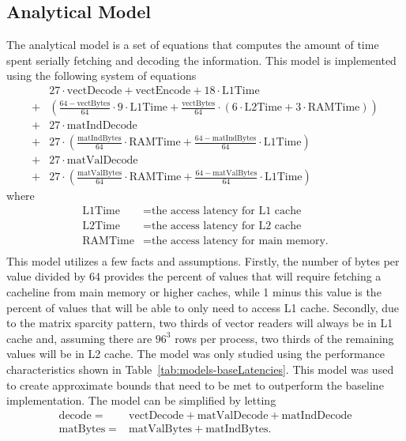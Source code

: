 \subsection{Analytical Model}

The analytical model is a set of equations that computes the amount of time spent serially fetching and decoding the information.
This model is implemented using the following system of equations
\begin{align*}
	& 27\cdot \mathrm{vectDecode}+\mathrm{vectEncode} + 18\cdot \mathrm{L1Time} \\
	+ & \left(\frac{64-\mathrm{vectBytes}}{64}\cdot 9\cdot \mathrm{L1Time}+\frac{\mathrm{vectBytes}}{64}\cdot \left(6\cdot \mathrm{L2Time}+3\cdot \mathrm{RAMTime}\right)\right) \\
	+ & 27\cdot\mathrm{matIndDecode} \\
	+ & 27\cdot\left(\frac{\mathrm{matIndBytes}}{64}\cdot\mathrm{RAMTime} + \frac{64-\mathrm{matIndBytes}}{64}\cdot\mathrm{L1Time}\right) \\
	+ & 27\cdot\mathrm{matValDecode} \\
	+ & 27\cdot\left(\frac{\mathrm{matValBytes}}{64}\cdot\mathrm{RAMTime}+\frac{64-\mathrm{matValBytes}}{64}\cdot\mathrm{L1Time}\right)
\end{align*}
where
\begin{align*}
	\mathrm{L1Time} &= \text{the access latency for L1 cache} \\
	\mathrm{L2Time} &= \text{the access latency for L2 cache} \\
	\mathrm{RAMTime} &= \text{the access latency for main memory.} \\
\end{align*}
This model utilizes a few facts and assumptions.
Firstly, the number of bytes per value divided by 64 provides the percent of values that will require fetching a cacheline from main memory or higher caches, while 1 minus this value is the percent of values that will be able to only need to access L1 cache.
Secondly, due to the matrix sparcity pattern, two thirds of vector readers will always be in L1 cache and, assuming there are \(96^3\) rows per process, two thirds of the remaining values will be in L2 cache.
The model was only studied using the performance characteristics shown in Table~\ref{tab:models-baseLatencies}.
This model was used to create approximate bounds that need to be met to outperform the baseline implementation.
The model can be simplified by letting
\begin{align*}
\mathrm{decode} =& \mathrm{vectDecode} + \mathrm{matValDecode} + \mathrm{matIndDecode} \\
\mathrm{matBytes} =& \mathrm{matValBytes} + \mathrm{matIndBytes}.
\end{align*}
